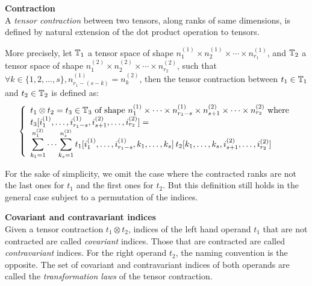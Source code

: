 \begin{definition}\textbf{Contraction}\\
A \emph{tensor contraction} between two tensors, along ranks of same dimensions, is defined by natural extension of the dot product operation to tensors.

More precisely, let $\mathbb{T}_1$ a tensor space of shape $n_1^{(1)} \times n_2^{(1)} \times \cdots \times n_{r_1}^{(1)}$, and $\mathbb{T}_2$ a tensor space of shape $n_1^{(2)} \times n_2^{(2)} \times \cdots \times n_{r_2}^{(2)}$, such that $\forall k \in \{1, 2, \ldots, s\}, n_{r_1-(s-k)}^{(1)} = n_k^{(2)}$, then the tensor contraction between $t_1 \in \mathbb{T}_1$ and $t_2 \in \mathbb{T}_2$ is defined as:
\begin{gather*}
\left\{
  \begin{array}{l}
    t_1 \otimes t_2 = t_3 \in \mathbb{T}_3 \text{ of shape } n_1^{(1)} \times \cdots \times n_{r_1-s}^{(1)} \times n_{s+1}^{(2)} \times \cdots \times n_{r_2}^{(2)}
    \text{ where} \\
    t_3[i_1^{(1)}, \ldots, i_{r_1-s}^{(1)}, i_{s+1}^{(2)}, \ldots, i_{r_2}^{(2)}] = \\
    \displaystyle \sum_{k_1=1}^{n_1^{(2)}} \cdots \sum_{k_s=1}^{n_s^{(2)}}
    t_1[i_1^{(1)}, \ldots, i_{r_1-s}^{(1)}, k_1, \ldots, k_s] \hspace{2pt}
    t_2[k_1, \ldots, k_s, i_{s+1}^{(2)}, \ldots, i_{r_2}^{(2)}]
  \end{array}
\right.
\end{gather*}
\end{definition}

For the sake of simplicity, we omit the case where the contracted ranks are not the last ones for $t_1$ and the first ones for $t_2$. But this definition still holds in the general case subject to a permutation of the indices.

\begin{definition}\textbf{Covariant and contravariant indices}\\
Given a tensor contraction $t_1 \otimes t_2$, indices of the left hand operand $t_1$ that are not contracted are called \emph{covariant} indices. Those that are contracted are called \emph{contravariant} indices. For the right operand $t_2$, the naming convention is the opposite. 
The set of covariant and contravariant indices of both operands are called the \emph{transformation laws} of the tensor contraction.
\end{definition}


